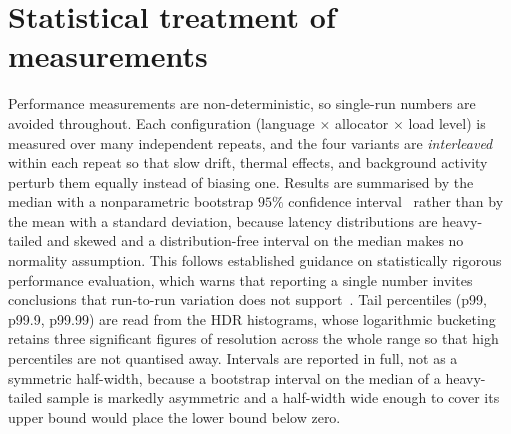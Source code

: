 \documentclass[english,oneside,a4paper,censored,csm,software-track-2020]{HYthesisML}
\begin{document}
\section{Statistical treatment of measurements}\label{sec:stats}
Performance measurements are non-deterministic, so single-run numbers are avoided throughout.
Each configuration (language $\times$ allocator $\times$ load level) is measured over many
independent repeats, and the four variants are \emph{interleaved} within each repeat so that
slow drift, thermal effects, and background activity perturb them equally instead of biasing
one. Results are summarised by the median with a nonparametric bootstrap $95\%$ confidence
interval~\cite{efron1993bootstrap} rather than by the mean with a standard deviation, because
latency distributions are
heavy-tailed and skewed and a distribution-free interval on the median makes no normality
assumption. This follows established guidance on statistically rigorous performance evaluation,
which warns that reporting a single number invites conclusions that run-to-run variation does
not support~\cite{georges2007rigorous}. Tail percentiles (p99, p99.9, p99.99) are read from the
HDR histograms, whose logarithmic bucketing retains three significant figures of resolution
across the whole range so that high percentiles are not quantised away. Intervals are reported
in full, not as a symmetric half-width, because a bootstrap interval on the median of a
heavy-tailed sample is markedly asymmetric and a half-width wide enough to cover its upper
bound would place the lower bound below zero.
\end{document}
